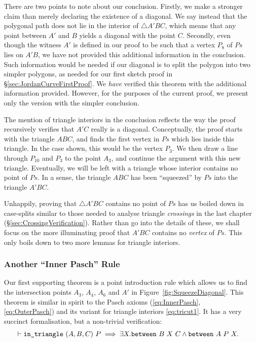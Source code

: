 There are two points to note about our conclusion. Firstly, we make a stronger claim than merely declaring the existence of a diagonal. We say instead that the polygonal path does not lie in the interior of $\triangle A'BC$, which means that any point between $A'$ and $B$ yields a diagonal with the point $C$. Secondly, even though the witness $A'$ is defined in our proof to be such that a vertex $P_8$ of $Ps$ lies on $A'B$, we have not provided this additional information in the conclusion. Such information would be needed if our diagonal is to split the polygon into two simpler polygons, as needed for our first sketch proof in \S\ref{sec:JordanCurveFirstProof}. We \emph{have} verified this theorem with the additional information provided. However, for the purposes of the current proof, we present only the version with the simpler conclusion.

The mention of triangle interiors in the conclusion reflects the way the proof recursively verifies that $A'C$ really is a diagonal. Conceptually, the proof starts with the triangle $ABC$, and finds the first vertex in $Ps$ which lies inside this triangle. In the case shown, this would be the vertex $P_3$. We then draw a line through $P_{10}$ and $P_3$ to the point $A_3$, and continue the argument with this new triangle. Eventually, we will be left with a triangle whose interior contains no point of $Ps$. In a sense, the triangle $ABC$ has been ``squeezed'' by $Ps$ into the triangle $A'BC$.

Unhappily, proving that $\triangle A'BC$ contains no point of $Ps$ has us boiled down in case-splits similar to those needed to analyse triangle \emph{crossings} in the last chapter (\S\ref{sec:CrossingVerification}). Rather than go into the details of these, we shall focus on the more illuminating proof that $A'BC$ contains no \emph{vertex} of $Ps$. This only boils down to two more lemmas for triangle interiors.

\subsubsection{Another ``Inner Pasch'' Rule}
Our first supporting theorem is a point introduction rule which allows us to find the intersection points $A_3$, $A_4$, $A_6$ and $A'$ in Figure~\ref{fig:SqueezeDiagonal}. This theorem is similar in spirit to the Pasch axioms (\ref{eq:InnerPasch}, \ref{eq:OuterPasch}) and its variant for triangle interiors \eqref{eq:tricut1}. It has a very succinct formalisation, but a non-trivial verification:
\begin{equation}\label{eq:TriCut3}
\vdash\texttt{in\_triangle}\ (A,B,C)\ P \implies \exists X. \texttt{between}\ B\ X\ C \wedge \texttt{between}\ A\ P\ X.
\end{equation}

